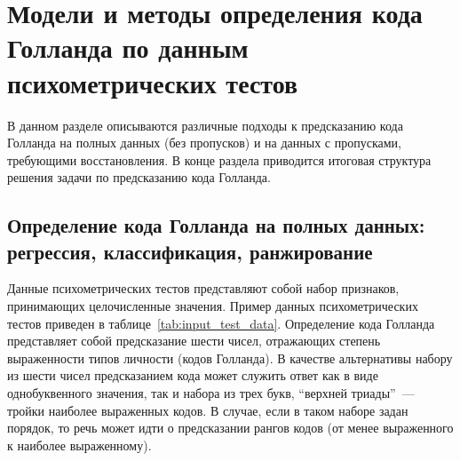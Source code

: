 
\section{Модели и методы определения кода Голланда по данным психометрических тестов}

В данном разделе описываются различные подходы к предсказанию кода Голланда на полных данных (без пропусков) и на данных с пропусками, требующими восстановления. В конце раздела приводится итоговая структура решения задачи по предсказанию кода Голланда.

\subsection{Определение кода Голланда на полных данных: регрессия, классификация, ранжирование}

Данные психометрических тестов представляют собой набор признаков, принимающих целочисленные значения. Пример данных психометрических тестов приведен в таблице~\ref{tab:input_test_data}. Определение кода Голланда представляет собой предсказание шести чисел, отражающих степень выраженности типов личности (кодов Голланда). В качестве альтернативы набору из шести чисел предсказанием кода может служить ответ как в виде однобуквенного значения, так и набора из трех букв, \enquote{верхней триады}~--- тройки наиболее выраженных кодов. В случае, если в таком наборе задан порядок, то речь может идти о предсказании рангов кодов (от менее выраженного к наиболее выраженному).

